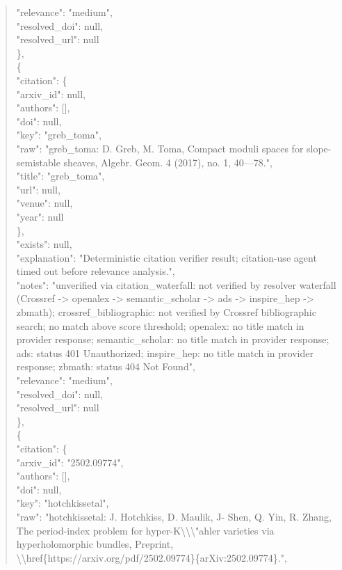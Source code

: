 \documentclass[11pt]{article}
\begin{document}
\begin{quote}
      "relevance": "medium",\\
      "resolved\_doi": null,\\
      "resolved\_url": null\\
    \},\\
    \{\\
      "citation": \{\\
        "arxiv\_id": null,\\
        "authors": [],\\
        "doi": null,\\
        "key": "greb\_toma",\\
        "raw": "greb\_toma: D. Greb, M. Toma, Compact moduli spaces for slope-semistable sheaves, Algebr. Geom. 4 (2017), no. 1, 40---78.",\\
        "title": "greb\_toma",\\
        "url": null,\\
        "venue": null,\\
        "year": null\\
      \},\\
      "exists": null,\\
      "explanation": "Deterministic citation verifier result; citation-use agent timed out before relevance analysis.",\\
      "notes": "unverified via citation\_waterfall: not verified by resolver waterfall (Crossref -> openalex -> semantic\_scholar -> ads -> inspire\_hep -> zbmath); crossref\_bibliographic: not verified by Crossref bibliographic search; no match above score threshold; openalex: no title match in provider response; semantic\_scholar: no title match in provider response; ads: status 401 Unauthorized; inspire\_hep: no title match in provider response; zbmath: status 404 Not Found",\\
      "relevance": "medium",\\
      "resolved\_doi": null,\\
      "resolved\_url": null\\
    \},\\
    \{\\
      "citation": \{\\
        "arxiv\_id": "2502.09774",\\
        "authors": [],\\
        "doi": null,\\
        "key": "hotchkissetal",\\
        "raw": "hotchkissetal: J. Hotchkiss, D. Maulik, J- Shen, Q. Yin, R. Zhang, The period-index problem for hyper-K\textbackslash{}\textbackslash{}\textbackslash{}"ahler varieties via hyperholomorphic bundles, Preprint, \textbackslash{}\textbackslash{}href\{https://arxiv.org/pdf/2502.09774\}\{arXiv:2502.09774\}.",\\

\end{quote}
\end{document}
